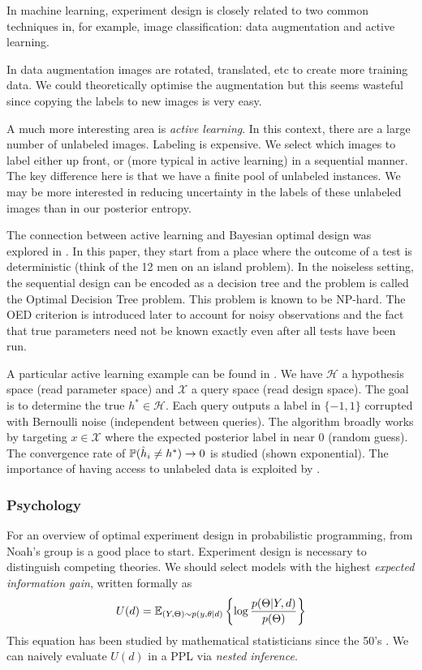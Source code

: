 In machine learning, experiment design is closely related to two common techniques in, for example, image classification: data augmentation and active learning.

In data augmentation images are rotated, translated, etc to create more training data. We could theoretically optimise the augmentation but this seems wasteful since copying the labels to new images is very easy.

A much more interesting area is \textit{active learning}. In this context, there are a large number of unlabeled images. Labeling is expensive. We select which images to label either up front, or (more typical in active learning) in a sequential manner. The key difference here is that we have a finite pool of unlabeled instances. We may be more interested in reducing uncertainty in the labels of these unlabeled images than in our posterior entropy.

The connection between active learning and Bayesian optimal design was explored in \cite{golovin2010}. In this paper, they start from a place where the outcome of a test is deterministic (think of the 12 men on an island problem). In the noiseless setting, the sequential design can be encoded as a decision tree and the problem is called the Optimal Decision Tree problem. This problem is known to be NP-hard. The OED criterion is introduced later to account for noisy observations and the fact that true parameters need not be known exactly even after all tests have been run.

A particular active learning example can be found in \cite{nowak2009}. We have $\mathcal{H}$ a hypothesis space (read parameter space) and $\mathcal{X}$ a query space (read design space). The goal is to determine the true $h^* \in \mathcal{H}$. Each query outputs a label in $\{-1, 1\}$ corrupted with Bernoulli noise (independent between queries). The algorithm broadly works by targeting $x \in \mathcal{X}$ where the expected posterior label in near $0$ (random guess). The convergence rate of $\mathbb{P}(\hat{h}_i \ne h^*) \to 0$ is studied (shown exponential). The importance of having access to unlabeled data is exploited by \cite{dasgupta2006}.

\subsubsection{Psychology}
For an overview of optimal experiment design in probabilistic programming, \cite{ouyang2016} from Noah's group is a good place to start. Experiment design is necessary to distinguish competing theories. We should select models with the highest \textit{expected information gain}, written formally as 
\begin{equation}
U(d) = \mathbb{E}_{(Y, \Theta) \sim p(y, \theta | d)}\left\{\log \frac{p(\Theta | Y, d)}{p(\Theta)}\right\}
\end{equation}
This equation has been studied by mathematical statisticians since the 50's \cite{lindley1956}. We can naively evaluate $U(d)$ in a PPL via \textit{nested inference}.

